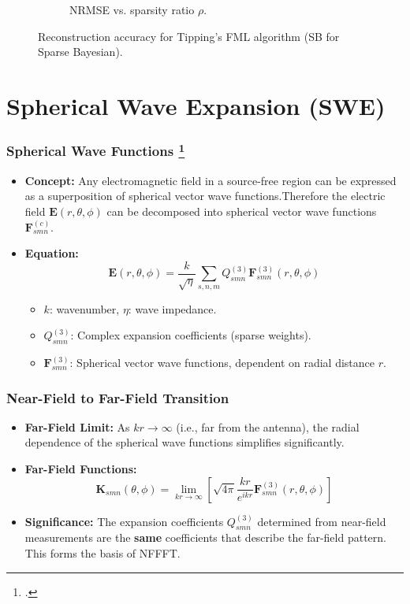 \documentclass{beamer}
\begin{document}
\begin{frame}
\begin{figure}[h!]
\begin{subfigure}[b]{0.48\textwidth}
            \caption{NRMSE vs. sparsity ratio $\rho$.}
        \end{subfigure}
        \caption{Reconstruction accuracy for Tipping's FML algorithm (SB for Sparse Bayesian).}
    \end{figure}
\end{frame}

\section{Spherical Wave Expansion (SWE)}

\begin{frame}
    \frametitle{Spherical Wave Functions \footcite{hansen1988spherical}}
    \begin{itemize}
        \item \textbf{Concept:} Any electromagnetic field in a source-free region can be expressed as a superposition of spherical vector wave functions.Therefore the electric field $\mathbf{E}(r, \theta, \phi)$ can be decomposed into spherical vector wave functions $\mathbf{F}_{smn}^{(c)}$.
        \item \textbf{Equation:}
        \begin{equation*}
            \mathbf{E}(r,\theta,\phi) = \frac{k}{\sqrt{\eta}} \sum_{s,n,m} Q_{smn}^{(3)} \mathbf{F}_{smn}^{(3)}(r,\theta,\phi)
        \end{equation*}
        \begin{itemize}
            \item $k$: wavenumber, $\eta$: wave impedance.
            \item $Q_{smn}^{(3)}$: Complex expansion coefficients (sparse weights).
            \item $\mathbf{F}_{smn}^{(3)}$: Spherical vector wave functions, dependent on radial distance $r$.
        \end{itemize}
    \end{itemize}
\end{frame}

\begin{frame}
    \frametitle{Near-Field to Far-Field Transition}
    \begin{itemize}
        \item \textbf{Far-Field Limit:} As $kr \to \infty$ (i.e., far from the antenna), the radial dependence of the spherical wave functions simplifies significantly.
        \item \textbf{Far-Field Functions:}
        \begin{equation*}
            \mathbf{K}_{smn}(\theta,\phi) = \lim_{kr \to \infty} \left[ \sqrt{4\pi} \frac{kr}{e^{ikr}} \mathbf{F}_{smn}^{(3)}(r,\theta,\phi) \right]
        \end{equation*}
        \item \textbf{Significance:} The expansion coefficients $Q_{smn}^{(3)}$ determined from near-field measurements are the \textbf{same} coefficients that describe the far-field pattern. This forms the basis of NFFFT.
    \end{itemize}
\end{frame}
\end{document}

